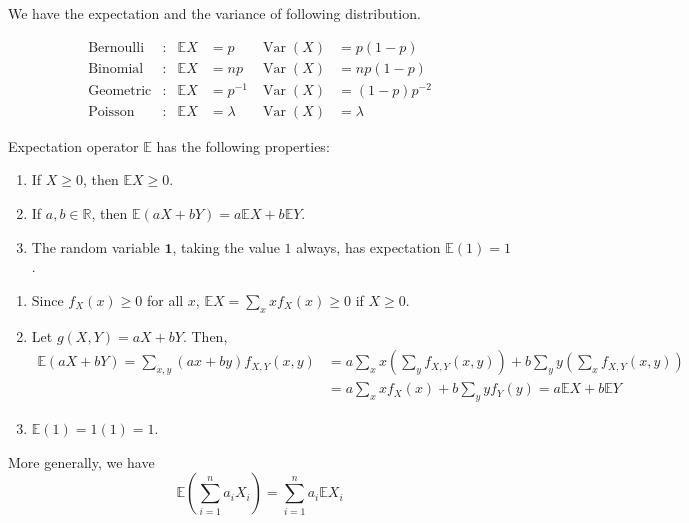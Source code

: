 \documentclass{huhtakm-template-book}
\newcommand{\expect}{\mathbb{E}}
\DeclareMathOperator{\Var}{Var}
\begin{document}
    We have the expectation and the variance of following distribution.
    \begin{eg}
        \begin{align*}
            \text{Bernoulli}&: & \expect X&=p & \Var(X)&=p(1-p)\\
            \text{Binomial}&: & \expect X&=np & \Var(X)&=np(1-p)\\
            \text{Geometric}&: & \expect X&=p^{-1} & \Var(X)&=(1-p)p^{-2}\\
            \text{Poisson}&: & \expect X&=\lambda & \Var(X)&=\lambda
        \end{align*}
    \end{eg}
    \begin{thm}
        Expectation operator $\expect$ has the following properties:
        \begin{enumerate}
            \item If $X\geq 0$, then $\expect X\geq 0$.
            \item If $a,b\in\mathbb{R}$, then $\expect(aX+bY)=a\expect X+b\expect Y$.
            \item The random variable $\mathbf{1}$, taking the value $1$ always, has expectation $\expect(1)=1$.
        \end{enumerate}
    \end{thm}
    \begin{proofing}
        \begin{enumerate}
            \item Since $f_{X}(x)\geq 0$ for all $x$, $\expect X=\sum_{x}xf_{X}(x)\geq 0$ if $X\geq 0$.
            \item Let $g(X,Y)=aX+bY$. Then,
            \begin{align*}
                \expect(aX+bY)=\sum_{x,y}(ax+by)f_{X,Y}(x,y)&=a\sum_{x}x\left(\sum_{y}f_{X,Y}(x,y)\right)+b\sum_{y}y\left(\sum_{x}f_{X,Y}(x,y)\right)\\
                &=a\sum_{x}xf_{X}(x)+b\sum_{y}yf_{Y}(y)=a\expect X+b\expect Y
            \end{align*}
            \item $\expect(1)=1(1)=1$.
        \end{enumerate}
    \end{proofing}
    \begin{rem}
        More generally, we have
        \begin{equation*}
            \expect\left(\sum_{i=1}^{n}a_{i}X_{i}\right)=\sum_{i=1}^{n}a_{i}\expect X_{i}
        \end{equation*}
    \end{rem}
\end{document}
